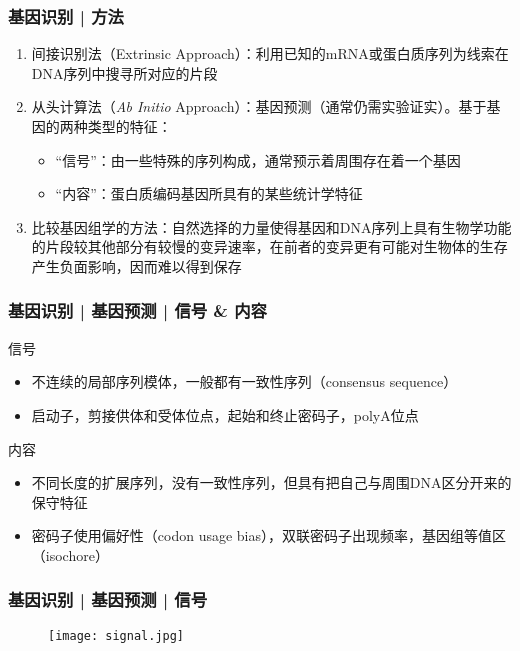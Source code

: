 \begin{frame}
  \frametitle{基因识别 | \alert{方法}}
  \begin{enumerate}
    \item 间接识别法（Extrinsic Approach）：利用已知的mRNA或蛋白质序列为线索在DNA序列中搜寻所对应的片段
    \item 从头计算法（\textit{Ab Initio} Approach）：基因预测（通常仍需实验证实）。基于基因的两种类型的特征：
      \begin{itemize}
        \item “信号”：由一些特殊的序列构成，通常预示着周围存在着一个基因
        \item “内容”：蛋白质编码基因所具有的某些统计学特征
      \end{itemize}
    \item 比较基因组学的方法：自然选择的力量使得基因和DNA序列上具有生物学功能的片段较其他部分有较慢的变异速率，在前者的变异更有可能对生物体的生存产生负面影响，因而难以得到保存
  \end{enumerate}
\end{frame}

\begin{frame}
  \frametitle{基因识别 | 基因预测 | \alert{信号 \& 内容}}
  \begin{block}{信号}
    \begin{itemize}
      \item 不连续的局部序列模体，一般都有一致性序列（consensus sequence）
      \item 启动子，剪接供体和受体位点，起始和终止密码子，polyA位点
    \end{itemize}
  \end{block}
  \pause
  \begin{block}{内容}
    \begin{itemize}
      \item 不同长度的扩展序列，没有一致性序列，但具有把自己与周围DNA区分开来的保守特征
      \item 密码子使用偏好性（codon usage bias），双联密码子出现频率，基因组等值区（isochore）
    \end{itemize}
  \end{block}
\end{frame}

\begin{frame}
  \frametitle{基因识别 | 基因预测 | 信号}
  \begin{figure}
    \centering
    \texttt{[image: signal.jpg]}
  \end{figure}
\end{frame}

